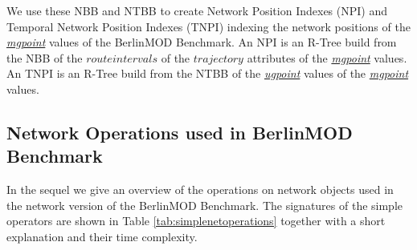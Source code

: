 \documentclass[a4paper]{article}
\newcommand{\bmodb} {BerlinMOD Benchmark}
\newcommand{\dt}[1]{\textsl{\underline{#1}}}
\begin{document}
We use these NBB and NTBB to create Network Position Indexes (NPI) and
Temporal Network Position Indexes (TNPI) indexing the network positions of
the \dt{mgpoint} values of the \bmodb{}. An NPI is an R-Tree build from the NBB
of the $route intervals$ of the $trajectory$ attributes of the \dt{mgpoint} values.
An TNPI is an R-Tree build from the NTBB of the \dt{ugpoint} values of the
\dt{mgpoint} values.
\subsection{Network Operations used in \bmodb{}}
\label{sec:implNetOperations}
In the sequel we give an overview of the operations on network objects used in
the network version of the \bmodb{}. The signatures of the simple operators are
shown in Table \ref{tab:simplenetoperations} together with a short explanation and
their time complexity.
\end{document}

